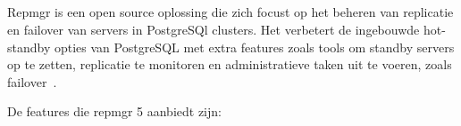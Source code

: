 \subsection{}
\label{subsec:Replication Manager (repmgr)}

Repmgr is een open source oplossing die zich focust op het beheren van replicatie en failover van servers in PostgreSQl clusters. Het verbetert de ingebouwde hot-standby opties van PostgreSQL met extra features zoals tools om standby servers op te zetten, replicatie te monitoren en administratieve taken uit te voeren, zoals failover~\autocite{2021a}. %

De features die repmgr 5 aanbiedt zijn:

\subsubsection{}
\label{subsubsec:De implementatie als een PostgreSQL extentie}


\subsubsection{}
\label{subsubsec:Replicatie cluster monitoring}


\subsubsection{}
\label{subsubsec:Standby klonen aan de hand van pg\_basebackup of Barman}

